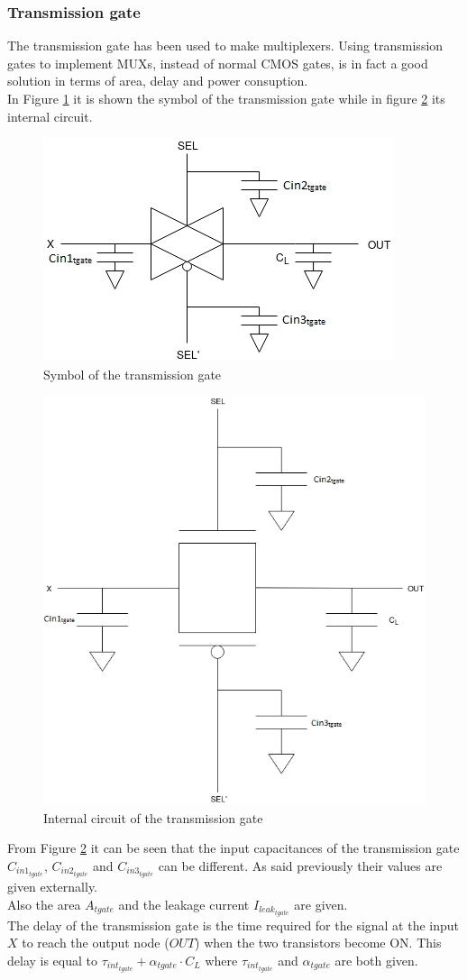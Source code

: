\subsubsection{Transmission gate}
The transmission gate has been used to make multiplexers. Using transmission gates to implement MUXs, instead of normal CMOS gates, is in fact a good solution in terms of area, delay and power consuption.\\
In Figure \ref{tgate_black_box} it is shown the symbol of the transmission gate while in figure \ref{tgate_interno} its internal circuit.

\begin{figure}[H]
\centering
\includegraphics[width = 8 cm, height = 5 cm]{pentium/transmission_gate_black_box.png}
\caption{Symbol of the transmission gate}
\label{tgate_black_box}
\end{figure}

\begin{figure}[H]
\centering
\includegraphics[width = 9 cm, height = 8 cm]{pentium/transmission_gate_interno.png}
\caption{Internal circuit of the transmission gate}
\label{tgate_interno}
\end{figure}

From Figure \ref{tgate_interno} it can be seen that the input capacitances of the transmission gate $C_{in1_{tgate}}$, $C_{in2_{tgate}}$ and $C_{in3_{tgate}}$ can be different. As said previously their values are given externally.\\
Also the area $A_{tgate}$ and the leakage current $I_{leak_{tgate}}$ are given.\\
The delay of the transmission gate is the time required for the signal at the input $X$ to reach the output node ($OUT$) when the two transistors become ON. This delay is equal to $\tau_{int_{tgate}}+\alpha_{tgate}\cdot C_L$ where $\tau_{int_{tgate}}$ and $\alpha_{tgate}$ are both given.





